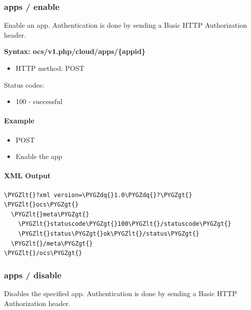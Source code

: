 \documentclass[letterpaper,10pt,english]{sphinxmanual}
\def\PYGZlt{\char`\<}
\def\PYGZgt{\char`\>}
\def\PYGZdq{\char`\"}
\begin{document}
\subsubsection{\textbf{apps / enable}}
\label{configuration_user/user_provisioning_api:apps-enable}
Enable an app.  Authentication is done by sending a Basic HTTP Authorization
header.

\textbf{Syntax: ocs/v1.php/cloud/apps/\{appid\}}
\begin{itemize}
\item {} 
HTTP method: POST

\end{itemize}

Status codes:
\begin{itemize}
\item {} 
100 - successful

\end{itemize}


\paragraph{Example}
\label{configuration_user/user_provisioning_api:id34}\begin{itemize}
\item {} 
POST 

\item {} 
Enable the  app

\end{itemize}


\paragraph{XML Output}
\label{configuration_user/user_provisioning_api:id35}
\begin{Verbatim}[commandchars=\\\{\}]
\PYGZlt{}?xml version=\PYGZdq{}1.0\PYGZdq{}?\PYGZgt{}
\PYGZlt{}ocs\PYGZgt{}
  \PYGZlt{}meta\PYGZgt{}
    \PYGZlt{}statuscode\PYGZgt{}100\PYGZlt{}/statuscode\PYGZgt{}
    \PYGZlt{}status\PYGZgt{}ok\PYGZlt{}/status\PYGZgt{}
  \PYGZlt{}/meta\PYGZgt{}
\PYGZlt{}/ocs\PYGZgt{}
\end{Verbatim}


\subsubsection{\textbf{apps / disable}}
\label{configuration_user/user_provisioning_api:apps-disable}
Disables the specified app. Authentication is
done by sending a Basic HTTP Authorization header.
\end{document}
